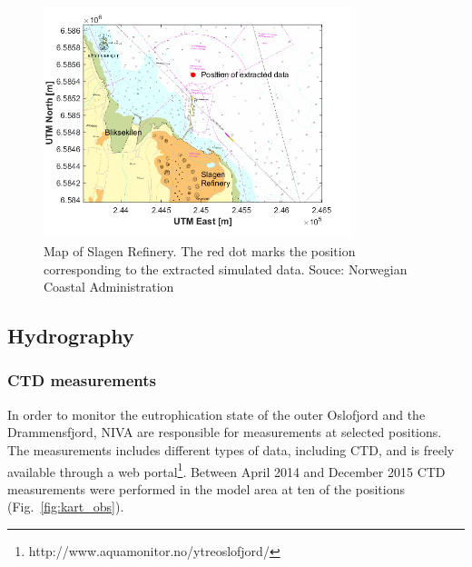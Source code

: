 \begin{figure}[htb]
\centerline{
\includegraphics*[trim=0cm 0cm 1cm 0cm,clip=true,width=0.8\textwidth]{Figurer/Slagen_kart}}
\caption{\small
Map of Slagen Refinery. The red dot marks the position corresponding to the extracted simulated data. Souce: Norwegian Coastal Administration}
\label{fig:Slagen-kart}
\end{figure}

\clearpage
\subsection{Hydrography}

\subsubsection{CTD measurements}

In order to monitor the eutrophication state of the outer Oslofjord and the Drammensfjord, NIVA are responsible for measurements at selected positions. The measurements includes different types of data, including CTD, and is freely available through a web portal\footnote{http://www.aquamonitor.no/ytreoslofjord/}. Between April 2014 and December 2015 CTD measurements were performed in the model area at ten of the positions (Fig.~\ref{fig:kart_obs}). 

